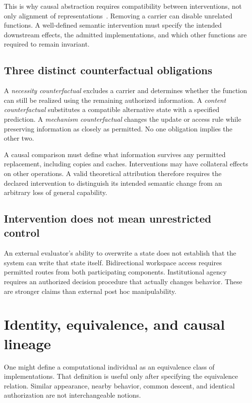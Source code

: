 This is why causal abstraction requires compatibility between interventions, not only alignment of representations~\cite{MS:rubenstein,MS:beckers}. Removing a carrier can disable unrelated functions. A well-defined semantic intervention must specify the intended downstream effects, the admitted implementations, and which other functions are required to remain invariant.

\subsection{Three distinct counterfactual obligations}
A \emph{necessity counterfactual} excludes a carrier and determines whether the function can still be realized using the remaining authorized information. A \emph{content counterfactual} substitutes a compatible alternative state with a specified prediction. A \emph{mechanism counterfactual} changes the update or access rule while preserving information as closely as permitted. No one obligation implies the other two.

A causal comparison must define what information survives any permitted replacement, including copies and caches. Interventions may have collateral effects on other operations. A valid theoretical attribution therefore requires the declared intervention to distinguish its intended semantic change from an arbitrary loss of general capability.

\subsection{Intervention does not mean unrestricted control}
An external evaluator's ability to overwrite a state does not establish that the system can write that state itself. Bidirectional workspace access requires permitted routes from both participating components. Institutional agency requires an authorized decision procedure that actually changes behavior. These are stronger claims than external post hoc manipulability.

\section{Identity, equivalence, and causal lineage}\label{MS:sec:identity}
One might define a computational individual as an equivalence class of implementations. That definition is useful only after specifying the equivalence relation. Similar appearance, nearby behavior, common descent, and identical authorization are not interchangeable notions.

